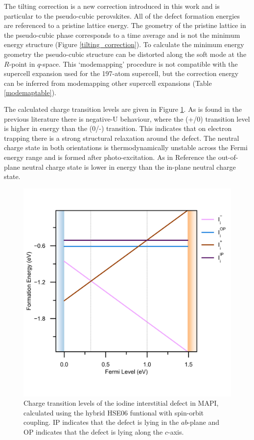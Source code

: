 The tilting correction is a new correction introduced in this work and is particular to the pseudo-cubic perovskites. All of the defect formation energies are referenced to a pristine lattice energy. The geometry of the pristine lattice in the pseudo-cubic phase corresponds to a time average and is not the minimum energy structure (Figure \ref{tilting_correction}). To calculate the minimum energy geometry the pseudo-cubic structure can be distorted along the soft mode at the $R$-point in $q$-space. This `modemapping' procedure\autocite{Skelton2016a} is not compatible with the supercell expansion used for the 197-atom supercell, but the correction energy can be inferred from modemapping other supercell expansions (Table \ref{modemaptable}).

The calculated charge transition levels are given in Figure \ref{charge_transition_diagram}. 
As is found in the previous literature\autocite{Du2015,Meggiolaro2018} there is negative-U behaviour, where the (+/0) transition level is higher in energy than the (0/-) transition. This indicates that on electron trapping there is a strong structural relaxation around the defect. The neutral charge state in both orientations is thermodynamically unstable across the Fermi energy range and is formed after photo-excitation. As in Reference \cite{Meggiolaro2018} the out-of-plane neutral charge state is lower in energy than the in-plane neutral charge state.

\begin{figure}[h!]   
\centering
  \includegraphics[width=0.7\columnwidth]{figures/ch6/charge_transition_HSE.png}
  \caption[Charge transition levels of $\mathrm{I}_\mathrm{i}$]{Charge transition levels of the iodine interstitial defect in MAPI, calculated using the hybrid HSE06 funtional with spin-orbit coupling. IP indicates that the defect is lying in the $ab$-plane and OP indicates that the defect is lying along the $c$-axis.}
\label{charge_transition_diagram}
\end{figure}

